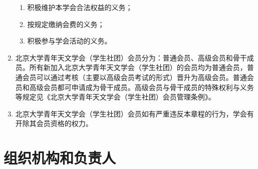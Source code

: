 \begin{enumerate}[resume]
    \begin{enumerate}
        \item 积极维护本学会合法权益的义务；
        \item 按规定缴纳会费的义务；
        \item 积极参与学会活动的义务。
    \end{enumerate}
    
    \item 北京大学青年天文学会（学生社团）会员分为：普通会员、高级会员和骨干成员。所有新加入北京大学青年天文学会（学生社团）的会员均为普通会员，普通会员可以通过考核（主要以高级会员考试的形式）晋升为高级会员。普通会员和高级会员都可申请成为骨干成员。高级会员与骨干成员的特殊权利与义务等规定见《北京大学青年天文学会（学生社团）会员管理条例》。
    
    \item 北京大学青年天文学会（学生社团）会员如有严重违反本章程的行为，学会有开除其会员资格的权力。 
\end{enumerate}

\section{组织机构和负责人}


